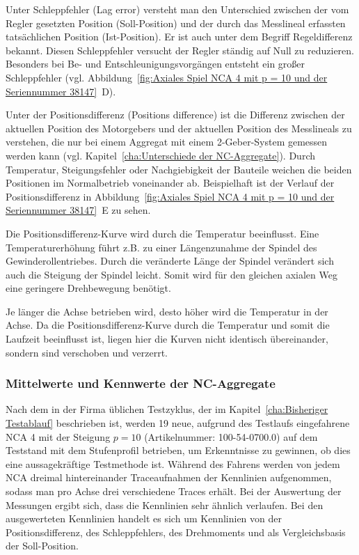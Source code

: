 Unter Schleppfehler (Lag error) versteht man den Unterschied zwischen der vom Regler gesetzten Position (Soll-Position) und der durch das Messlineal erfassten tatsächlichen Position (Ist-Position). Er ist auch unter dem Begriff Regeldifferenz bekannt. Diesen Schleppfehler versucht der Regler ständig auf Null zu reduzieren. Besonders bei Be- und Entschleunigungsvorgängen entsteht ein großer Schleppfehler (vgl. Abbildung~\ref{fig:Axiales Spiel NCA 4 mit p = 10 und der Seriennummer 38147}~D).



Unter der Positionsdifferenz (Positions difference) ist die Differenz zwischen der aktuellen Position des Motorgebers und der aktuellen Position des Messlineals zu verstehen, die nur bei einem Aggregat mit einem 2-Geber-System gemessen werden kann (vgl. Kapitel~\ref{cha:Unterschiede der NC-Aggregate}). Durch Temperatur, Steigungsfehler oder Nachgiebigkeit der Bauteile weichen die beiden Positionen im Normalbetrieb voneinander ab. Beispielhaft ist der Verlauf der Positionsdifferenz in Abbildung~\ref{fig:Axiales Spiel NCA 4 mit p = 10 und der Seriennummer 38147}~E zu sehen. %

Die Positionsdifferenz-Kurve wird durch die Temperatur beeinflusst.  Eine Temperaturerhöhung führt z.B. zu einer Längenzunahme der Spindel des Gewinderollentriebes. Durch die veränderte Länge der Spindel verändert sich auch die Steigung der Spindel leicht. Somit wird für den gleichen axialen Weg eine geringere Drehbewegung benötigt. 


Je länger die Achse betrieben wird, desto höher wird die Temperatur in der Achse. Da die Positionsdifferenz-Kurve durch die Temperatur und somit die Laufzeit beeinflusst ist, liegen hier die Kurven nicht identisch übereinander, sondern sind verschoben und verzerrt.




\subsubsection{Mittelwerte und Kennwerte der NC-Aggregate}\label{cha:Mittelwerte und Kennwerte der NC-Aggragate}

Nach dem in der Firma üblichen Testzyklus, der im Kapitel~\ref{cha:Bisheriger Testablauf} beschrieben ist, werden 19 neue, aufgrund des Testlaufs eingefahrene NCA 4 mit der Steigung $p = 10$ (Artikelnummer: 100-54-0700.0) auf dem Teststand mit dem Stufenprofil betrieben, um Erkenntnisse zu gewinnen, ob dies eine aussagekräftige Testmethode ist. Während des Fahrens werden von jedem NCA dreimal hintereinander Traceaufnahmen der Kennlinien aufgenommen, sodass man pro Achse drei verschiedene Traces erhält. Bei der Auswertung der Messungen ergibt sich, dass die Kennlinien sehr ähnlich verlaufen. Bei den ausgewerteten Kennlinien handelt es sich um Kennlinien von der Positionsdifferenz, des Schleppfehlers, des Drehmoments und als Vergleichsbasis der Soll-Position.


